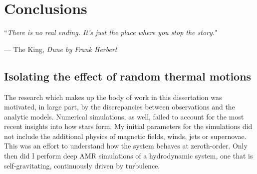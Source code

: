 \documentclass[../dissertation.tex]{subfiles}
\begin{document}
\chapter{Conclusions}
\label{ch:conclusions}

\singlespace
\epigraph{``\emph{There is no real ending. It's just the place where you stop the story.}"}{--- \textup{The King}, \textit{Dune by Frank Herbert}}

\dblspace






\section{Isolating the effect of random thermal motions}

The research which makes up the body of work in this dissertation was motivated, in large part, 
by the discrepancies between observations and the analytic models. 
Numerical simulations, as well, failed to account for the most recent insights into how stars form. 
My initial parameters for the simulations did not include the additional physics of magnetic fields, winds, jets or supernovae. 
This was an effort to understand  how the system behaves at zeroth-order. 
Only then did I perform deep AMR simulations of a hydrodynamic system, one that is self-gravitating, continuously driven by turbulence. 
\end{document}
